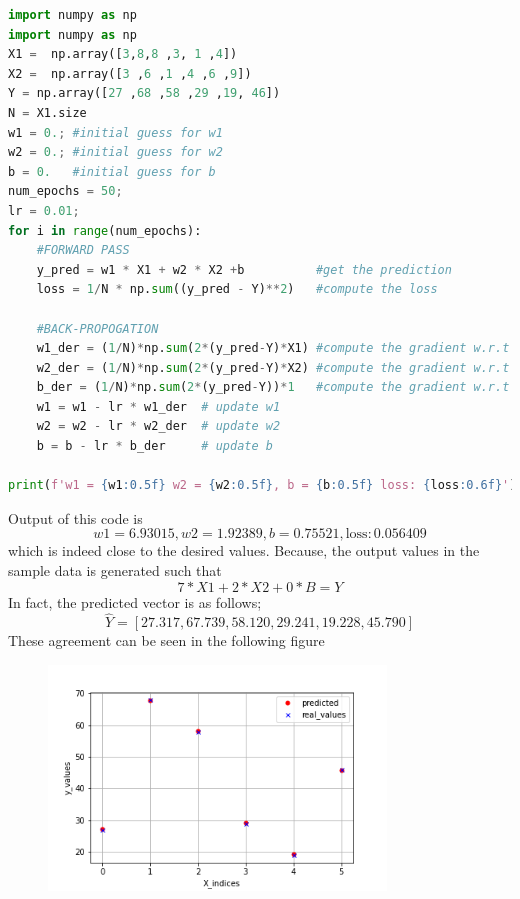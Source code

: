 \documentclass[12pt]{article}
\begin{document}
\begin{center}

\begin{lstlisting}[language=Python]
import numpy as np
import numpy as np
X1 =  np.array([3,8,8 ,3, 1 ,4])
X2 =  np.array([3 ,6 ,1 ,4 ,6 ,9])
Y = np.array([27 ,68 ,58 ,29 ,19, 46])
N = X1.size
w1 = 0.; #initial guess for w1
w2 = 0.; #initial guess for w2
b = 0.   #initial guess for b
num_epochs = 50;
lr = 0.01;
for i in range(num_epochs):
    #FORWARD PASS
    y_pred = w1 * X1 + w2 * X2 +b          #get the prediction
    loss = 1/N * np.sum((y_pred - Y)**2)   #compute the loss
    
    #BACK-PROPOGATION
    w1_der = (1/N)*np.sum(2*(y_pred-Y)*X1) #compute the gradient w.r.t w1
    w2_der = (1/N)*np.sum(2*(y_pred-Y)*X2) #compute the gradient w.r.t w2
    b_der = (1/N)*np.sum(2*(y_pred-Y))*1   #compute the gradient w.r.t b
    w1 = w1 - lr * w1_der  # update w1
    w2 = w2 - lr * w2_der  # update w2
    b = b - lr * b_der     # update b
    
print(f'w1 = {w1:0.5f} w2 = {w2:0.5f}, b = {b:0.5f} loss: {loss:0.6f}')
\end{lstlisting}
\end{center}
Output of this code is $$w1 = 6.93015, w2 = 1.92389, b = 0.75521, \text{loss}: 0.056409$$
which is indeed close to the desired values. Because, the output values in the sample data is generated such that 
$$7*X1+2*X2 +0*B = Y$$ 
In fact, the predicted vector is as follows;
$$\hat{Y} = [27.317 ,67.739 ,58.120 ,29.241 ,19.228 ,45.790]$$These agreement can be seen in the following figure


\begin{figure}[H]
  \centering
  \includegraphics[width=0.8\textwidth]{grad_dec.png}
\end{figure}
\end{document}
